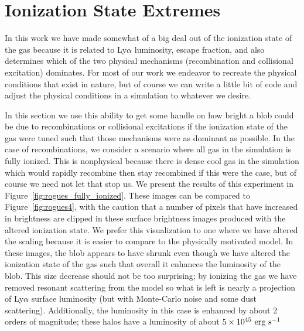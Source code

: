 \section{Ionization State Extremes}
\label{sec:ionization_extremes}
In this work we have made somewhat of a big deal out of the ionization state of the gas because it is related to Ly$\alpha$ luminosity, escape fraction, and also determines which of the two physical mechanisms (recombination and collisional excitation) dominates.
For most of our work we endeavor to recreate the physical conditions that exist in nature, but of course we can write a little bit of code and adjust the physical conditions in a simulation to whatever we desire.

In this section we use this ability to get some handle on how bright a blob could be due to recombinations or collisional excitations if the ionization state of the gas were tuned such that those mechanisms were as dominant as possible.
In the case of recombinations, we consider a scenario where all gas in the simulation is fully ionized.
This is nonphysical because there is dense cool gas in the simulation which would rapidly recombine then stay recombined if this were the case, but of course we need not let that stop us.
We present the results of this experiment in Figure~\ref{fig:rogues_fully_ionized}.
These images can be compared to Figure~\ref{fig:rogues4}, with the caution that a number of pixels that have increased in brightness are clipped in these surface brightness images produced with the altered ionization state.
We prefer this visualization to one where we have altered the scaling because it is easier to compare to the physically motivated model.
In these images, the blob appears to have shrunk even though we have altered the ionization state of the gas such that overall it enhances the luminosity of the blob.
This size decrease should not be too surprising; by ionizing the gas we have removed resonant scattering from the model so what is left is nearly a projection of Ly$\alpha$ surface luminosity (but with Monte-Carlo noise and some dust scattering).
Additionally, the luminosity in this case is enhanced by about 2 orders of magnitude; these halos have a luminosity of about $5\times10^{45}\ \rm{erg}\ \rm{s}^{-1}$

